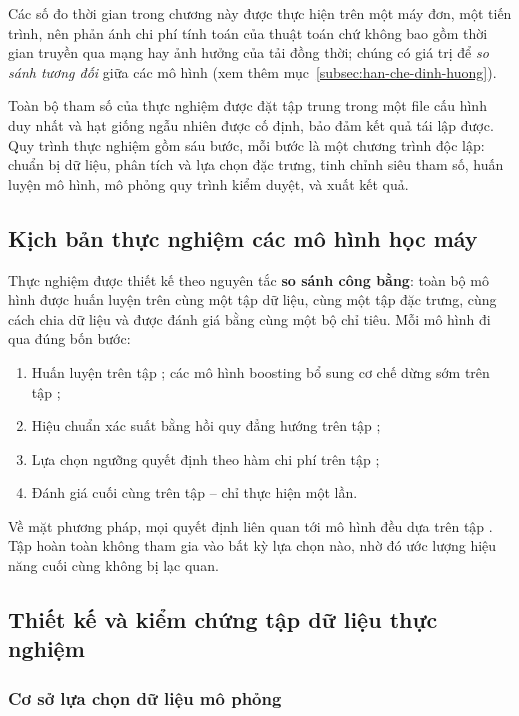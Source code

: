 Các số đo thời gian trong chương này được thực hiện trên một máy đơn, một tiến
trình, nên phản ánh chi phí tính toán của thuật toán chứ không bao gồm thời gian
truyền qua mạng hay ảnh hưởng của tải đồng thời; chúng có giá trị để \textit{so
sánh tương đối} giữa các mô hình (xem thêm mục~\ref{subsec:han-che-dinh-huong}).

Toàn bộ tham số của thực nghiệm được đặt tập trung trong một file cấu hình duy
nhất và hạt giống ngẫu nhiên được cố định, bảo đảm kết quả tái lập được. Quy
trình thực nghiệm gồm sáu bước, mỗi bước là một chương trình độc lập: chuẩn bị dữ
liệu, phân tích và lựa chọn đặc trưng, tinh chỉnh siêu tham số, huấn luyện mô
hình, mô phỏng quy trình kiểm duyệt, và xuất kết quả.

\subsection{Kịch bản thực nghiệm các mô hình học máy}
\label{subsec:kich-ban}

Thực nghiệm được thiết kế theo nguyên tắc \textbf{so sánh công bằng}: toàn bộ
\NModels{} mô hình được huấn luyện trên cùng một tập dữ liệu, cùng một tập đặc
trưng, cùng cách chia dữ liệu và được đánh giá bằng cùng một bộ chỉ tiêu. Mỗi mô
hình đi qua đúng bốn bước:

\begin{enumerate}[label=(\arabic*)]
  \item Huấn luyện trên tập ; các mô hình boosting bổ sung cơ
  chế dừng sớm trên tập ;
  \item Hiệu chuẩn xác suất bằng hồi quy đẳng hướng trên tập ;
  \item Lựa chọn ngưỡng quyết định theo hàm chi phí trên tập ;
  \item Đánh giá cuối cùng trên tập  -- chỉ thực hiện một lần.
\end{enumerate}

Về mặt phương pháp, mọi quyết định liên quan tới mô hình đều dựa trên tập
. Tập  hoàn toàn không tham gia vào bất kỳ lựa
chọn nào, nhờ đó ước lượng hiệu năng cuối cùng không bị lạc quan.

\subsection{Thiết kế và kiểm chứng tập dữ liệu thực nghiệm}
\label{sec:data-design}

\subsubsection{Cơ sở lựa chọn dữ liệu mô phỏng}

